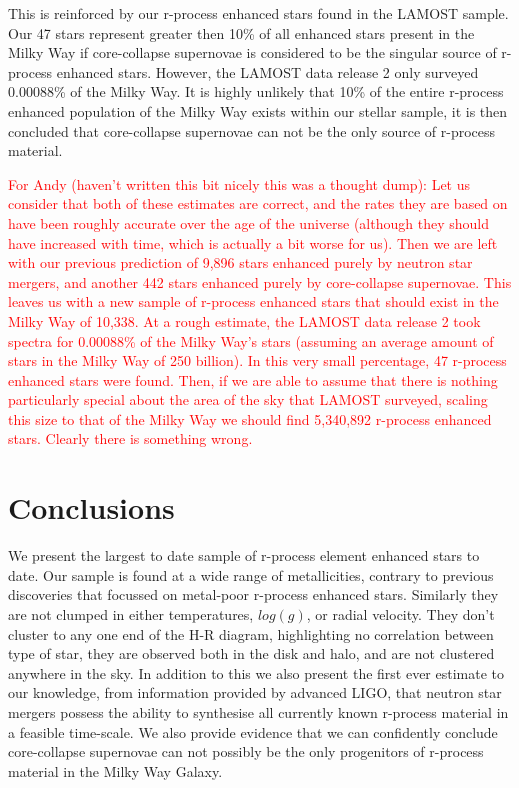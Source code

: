 \documentclass[a4paper,fleqn,usenatbib]{mnras}
\newcommand{\todo}[1]{\textcolor{red}{#1}}
\begin{document}
    This is reinforced by our r-process enhanced stars found in the LAMOST sample. Our 47 stars represent greater then 10\% of all enhanced stars present in the Milky Way if core-collapse supernovae is considered to be the singular source of r-process enhanced stars. However, the LAMOST data release 2 only surveyed 0.00088\% of the Milky Way. It is highly unlikely that 10\% of the entire r-process enhanced population of the Milky Way exists within our stellar sample, it is then concluded that core-collapse supernovae can not be the only source of r-process material. 
    
    \todo{For Andy (haven't written this bit nicely this was a thought dump): Let us consider that both of these estimates are correct, and the rates they are based on have been roughly accurate over the age of the universe (although they should have increased with time, which is actually a bit worse for us). Then we are left with our previous prediction of 9,896 stars enhanced purely by neutron star mergers, and another 442 stars enhanced purely by core-collapse supernovae. This leaves us with a new sample of r-process enhanced stars that should exist in the Milky Way of 10,338. 
    At a rough estimate, the LAMOST data release 2 took spectra for 0.00088\% of the Milky Way's stars (assuming an average amount of stars in the Milky Way of 250 billion). In this very small percentage, 47 r-process enhanced stars were found. Then, if we are able to assume that there is nothing particularly special about the area of the sky that LAMOST surveyed, scaling this size to that of the Milky Way we should find 5,340,892 r-process enhanced stars. Clearly there is something wrong.}
    
	
	\section{Conclusions}
	We present the largest to date sample of r-process element enhanced stars to date. Our sample is found at a wide range of metallicities, contrary to previous discoveries that focussed on metal-poor r-process enhanced stars. Similarly they are not clumped in either temperatures, $log(g)$, or radial velocity. They don't cluster to any one end of the H-R diagram, highlighting no correlation between type of star, they are observed both in the disk and halo, and are not clustered anywhere in the sky. In addition to this we also present the first ever estimate to our knowledge, from information provided by advanced LIGO, that neutron star mergers possess the ability to synthesise all currently known r-process material in a feasible time-scale. We also provide evidence that we can confidently conclude core-collapse supernovae can not possibly be the only progenitors of r-process material in the Milky Way Galaxy.
	
\end{document}
